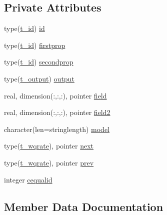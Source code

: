 \subsection*{Private Attributes}
\begin{DoxyCompactItemize}
\item 
type(\mbox{\hyperlink{structmodulewaterproperties_1_1t__id}{t\+\_\+id}}) \mbox{\hyperlink{structmodulewaterproperties_1_1t__wqrate_a8ea824086012276eff9fbc4b5de26ebb}{id}}
\item 
type(\mbox{\hyperlink{structmodulewaterproperties_1_1t__id}{t\+\_\+id}}) \mbox{\hyperlink{structmodulewaterproperties_1_1t__wqrate_a76c220eb7d05751e0cbd784e6d5d1bab}{firstprop}}
\item 
type(\mbox{\hyperlink{structmodulewaterproperties_1_1t__id}{t\+\_\+id}}) \mbox{\hyperlink{structmodulewaterproperties_1_1t__wqrate_a1f91a8e1dc25d4ceb08324faa3edf474}{secondprop}}
\item 
type(\mbox{\hyperlink{structmodulewaterproperties_1_1t__output}{t\+\_\+output}}) \mbox{\hyperlink{structmodulewaterproperties_1_1t__wqrate_a024001e2f992a16de64025127d257845}{output}}
\item 
real, dimension(\+:,\+:,\+:), pointer \mbox{\hyperlink{structmodulewaterproperties_1_1t__wqrate_a93aecd2df720e062f3f3b7e57698a10e}{field}}
\item 
real, dimension(\+:,\+:,\+:), pointer \mbox{\hyperlink{structmodulewaterproperties_1_1t__wqrate_a21e00f4b93dd5faf46f29fd04a616dec}{field2}}
\item 
character(len=stringlength) \mbox{\hyperlink{structmodulewaterproperties_1_1t__wqrate_a13a4c60584f1ff46d2c722dd77ce8053}{model}}
\item 
type(\mbox{\hyperlink{structmodulewaterproperties_1_1t__wqrate}{t\+\_\+wqrate}}), pointer \mbox{\hyperlink{structmodulewaterproperties_1_1t__wqrate_a6557e43b168df1b877cb0363ed3e05f7}{next}}
\item 
type(\mbox{\hyperlink{structmodulewaterproperties_1_1t__wqrate}{t\+\_\+wqrate}}), pointer \mbox{\hyperlink{structmodulewaterproperties_1_1t__wqrate_a198afac66ca3e27e29bc88dcd2869e8d}{prev}}
\item 
integer \mbox{\hyperlink{structmodulewaterproperties_1_1t__wqrate_a6bce65398f322f90c9bfdcd4c374e1f9}{cequalid}}
\end{DoxyCompactItemize}


\subsection{Member Data Documentation}
\mbox{\label{structmodulewaterproperties_1_1t__wqrate_a6bce65398f322f90c9bfdcd4c374e1f9}} 
